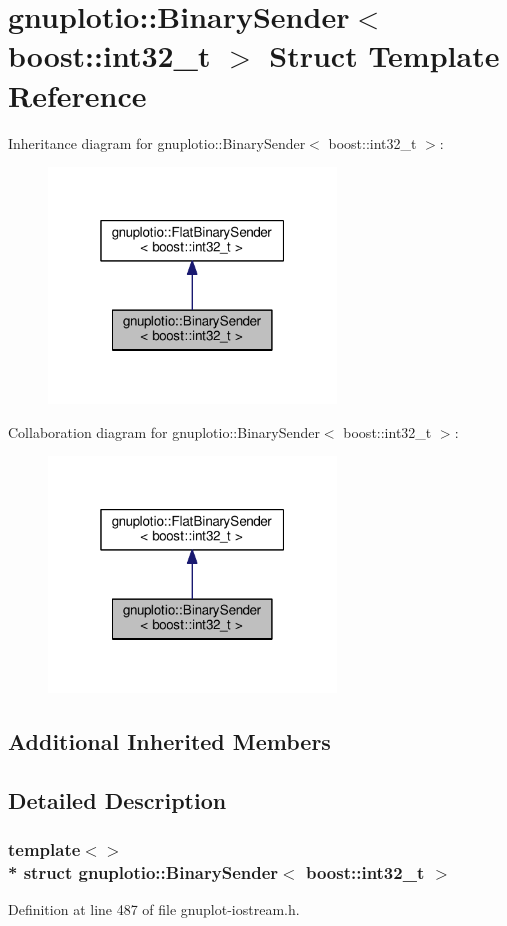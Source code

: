 \hypertarget{structgnuplotio_1_1_binary_sender_3_01boost_1_1int32__t_01_4}{}\section{gnuplotio\+:\+:Binary\+Sender$<$ boost\+:\+:int32\+\_\+t $>$ Struct Template Reference}
\label{structgnuplotio_1_1_binary_sender_3_01boost_1_1int32__t_01_4}


Inheritance diagram for gnuplotio\+:\+:Binary\+Sender$<$ boost\+:\+:int32\+\_\+t $>$\+:\nopagebreak
\begin{figure}[H]
\begin{center}
\leavevmode
\includegraphics[width=217pt]{structgnuplotio_1_1_binary_sender_3_01boost_1_1int32__t_01_4__inherit__graph}
\end{center}
\end{figure}


Collaboration diagram for gnuplotio\+:\+:Binary\+Sender$<$ boost\+:\+:int32\+\_\+t $>$\+:\nopagebreak
\begin{figure}[H]
\begin{center}
\leavevmode
\includegraphics[width=217pt]{structgnuplotio_1_1_binary_sender_3_01boost_1_1int32__t_01_4__coll__graph}
\end{center}
\end{figure}
\subsection*{Additional Inherited Members}


\subsection{Detailed Description}
\subsubsection*{template$<$$>$\\*
struct gnuplotio\+::\+Binary\+Sender$<$ boost\+::int32\+\_\+t $>$}



Definition at line 487 of file gnuplot-\/iostream.\+h.

